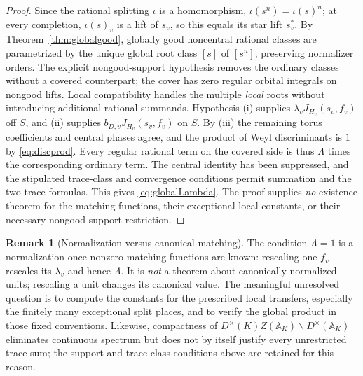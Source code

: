 \documentclass[11pt]{article}
\theoremstyle{plain}
\theoremstyle{definition}
\newtheorem{remark}[theorem]{Remark}
\begin{document}
\begin{proof}
Since the rational splitting $\iota$ is a homomorphism,
$\iota(s^n)=\iota(s)^n$; at every completion, $\iota(s)_v$
is a lift of $s_v$, so this equals its star lift $s_v^*$.
By Theorem~\ref{thm:globalgood}, globally good noncentral
rational classes are parametrized by the unique global root
class $[s]$ of $[s^n]$, preserving normalizer orders.
The explicit nongood-support hypothesis removes the ordinary
classes without a covered counterpart; the cover has zero
regular orbital integrals on nongood lifts.  Local compatibility
handles the multiple \emph{local} roots without introducing
additional rational summands.  Hypothesis (i) supplies
$\lambda_v J_{H_v}(s_v,f_v)$ off $S$, and (ii) supplies
$b_{D,v}J_{H_v}(s_v,f_v)$ on $S$. By (iii) the remaining torus
coefficients and central phases agree, and the product of Weyl
discriminants is $1$ by \eqref{eq:discprod}.  Every regular
rational term on the covered side is thus $\Lambda$ times the
corresponding ordinary term.  The central identity has been
suppressed, and the stipulated trace-class and convergence
conditions permit summation and the two trace formulas. This
gives \eqref{eq:globalLambda}.  The proof supplies \emph{no}
existence theorem for the matching functions, their exceptional
local constants, or their necessary nongood support restriction.
\end{proof}

\begin{remark}[Normalization versus canonical matching]
The condition $\Lambda=1$ is a normalization once nonzero
matching functions are known: rescaling one $\widetilde f_v$
rescales its $\lambda_v$ and hence $\Lambda$. It is \emph{not}
a theorem about canonically normalized units; rescaling a unit
changes its canonical value.  The meaningful unresolved question
is to compute the constants for the prescribed local transfers,
especially the finitely many exceptional split places, and to
verify the global product in those fixed conventions.
Likewise, compactness of $D^\times(K)Z(\mathbb A_K)\backslash
D^\times(\mathbb A_K)$ eliminates continuous spectrum but does
not by itself justify every unrestricted trace sum; the support
and trace-class conditions above are retained for this reason.
\end{remark}
\end{document}
